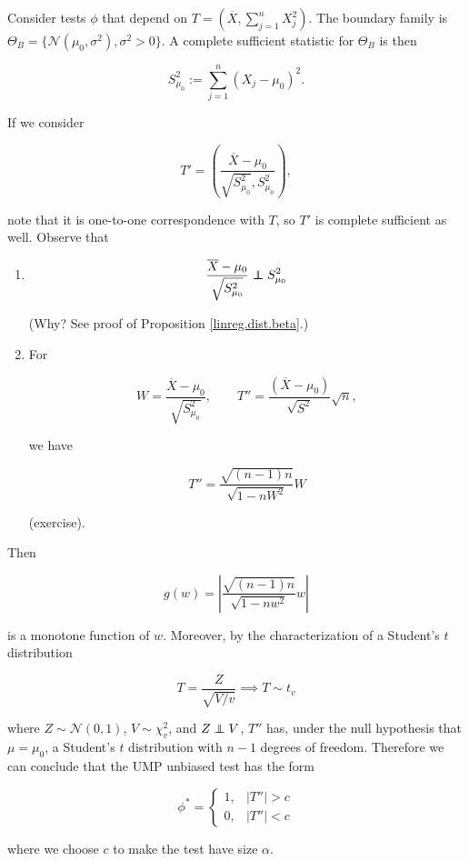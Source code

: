 \begin{solution}

Consider tests \(\phi\) that depend on \(T = (\overline{X}, \sum_{j=1}^n X_j^2)\). The boundary family is \(\Theta_B = \{ \mathcal{N}(\mu_0, \sigma^2), \sigma^2 > 0\}\). A complete sufficient statistic for \(\Theta_B\) is then 

\[
S_{\mu_0}^2 :=  \sum_{j=1}^n (X_j - \mu_0)^2.
\]

If we consider

\[
T' = \left( \frac{ \overline{X} - \mu_0}{\sqrt{S_{\mu_0}^2}, S_{\mu_0}^2} \right),
\]

note that it is one-to-one correspondence with \(T\), so \(T'\) is complete sufficient as well. Observe that

\begin{enumerate}[(1)]

\item

\[
\frac{\overline{X} - \mu_0}{\sqrt{S_{\mu_0}^2}} \indep S_{\mu_0}^2
\]

(Why? See proof of Proposition \ref{linreg.dist.beta}.)

\item For 

\[
W = \frac{\overline{X} - \mu_0}{\sqrt{S_{\mu_0}^2}} , \qquad T'' = \frac{(\overline{X} - \mu_0) }{\sqrt{S^2}} \sqrt{n},
\]

we have

\[
T'' = \frac{\sqrt{(n-1)n}}{\sqrt{1 - nW^2}} W
\]

(exercise). 

\end{enumerate}

Then

\[
g(w) = \left| \frac{\sqrt{(n-1)n}}{\sqrt{1 - nw^2}} w\right|
\]

is a monotone function of \(w\). Moreover, by the characterization of a Student's \(t\) distribution

\[
T = \frac{Z}{\sqrt{V/v}} \implies T \sim t_v
\]

where \(Z \sim \mathcal{N}(0,1)\), \(V \sim \chi_v^2\), and \(Z \indep V\), \(T''\) has, under the null hypothesis that \(\mu = \mu_0\), a Student's \(t\) distribution with \(n-1\) degrees of freedom. Therefore we can conclude that the UMP unbiased test has the form 

\[
\phi^* = \begin{cases}
1, &  |T''| > c\\
0, & |T''|  < c
\end{cases}
\]

where we choose \(c\) to make the test have size \(\alpha\).

\end{solution}

